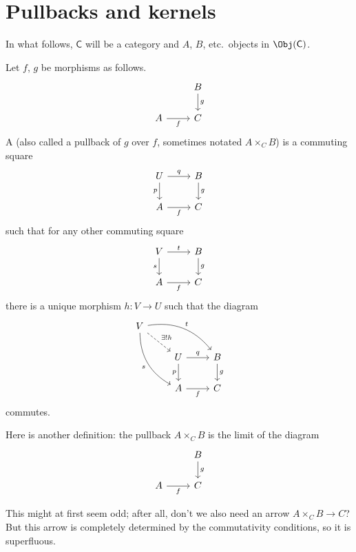 \documentclass[notes.tex]{subfiles}
\begin{document}
\section{Pullbacks and kernels}

In what follows, $\mathsf{C}$ will be a category and $A$, $B$, etc.\ objects in $\Obj(\mathsf{C})$.
\begin{definition}[pullback]
  \label{def:pullback_along_a_functor}
  Let $f$, $g$ be morphisms as follows.
  \begin{equation*}
    \begin{tikzcd}
      & B \arrow[d, "g"] \\
      A \arrow[r, swap, "f"] & C
    \end{tikzcd}
  \end{equation*}
  A  (also called a pullback of $g$ over $f$, sometimes notated $A \times_{C} B$) is a commuting square
  \begin{equation*}
    \begin{tikzcd}
      U \arrow[r, "q"] \arrow[d, "p", swap] & B \arrow[d, "g"] \\
      A \arrow[r, swap, "f"] & C
    \end{tikzcd}
  \end{equation*}
  such that for any other commuting square
  \begin{equation*}
    \begin{tikzcd}
      V \arrow[r, "t"] \arrow[d, "s", swap] & B \arrow[d, "g"] \\
      A \arrow[r, swap, "f"] & C
    \end{tikzcd}
  \end{equation*}
  there is a unique morphism $h\colon V \to U$ such that the diagram
  \begin{equation*}
    \begin{tikzcd}
      V
      \arrow[rrd, bend left, "t"]
      \arrow[rd, dashed, "\exists!h"]
      \arrow[rdd, bend right, swap, "s"]
      \\
      & U
      \arrow[r, "q"]
      \arrow[d, swap, "p"]
      & B
      \arrow[d, "g"]
      \\
      & A
      \arrow[r, swap, "f"]
      & C
    \end{tikzcd}
  \end{equation*}
  commutes.
\end{definition}
\begin{note}
  Here is another definition: the pullback $A \times_{C} B$ is the limit of the diagram
  \begin{equation*}
    \begin{tikzcd}
      & B
      \arrow[d, "g"]
      \\
      A
      \arrow[r, swap, "f"]
      & C
    \end{tikzcd}
  \end{equation*}

  This might at first seem odd; after all, don't we also need an arrow $A \times_{C} B \to C$? But this arrow is completely determined by the commutativity conditions, so it is superfluous.
\end{note}
\end{document}
